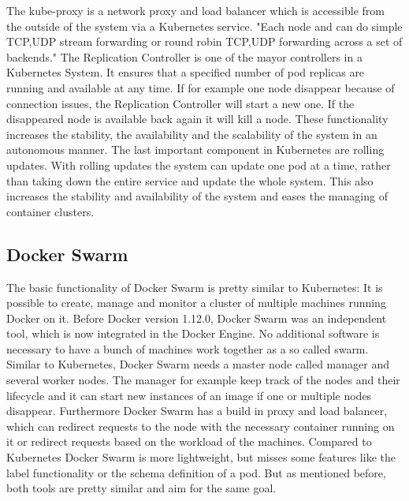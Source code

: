 The kube-proxy is a network proxy and load balancer which is accessible from the outside of the system via a Kubernetes service.\cite[cf.][p. 7]{Mulyana:2016}
"Each node and can do simple TCP,UDP stream forwarding or round robin TCP,UDP forwarding across a set of backends."\cite{Kubernetes:kube-proxy:2016}
The Replication Controller is one of the mayor controllers in a Kubernetes System.
It ensures that a specified number of pod replicas are running and available at any time.\cite[cf.]{Kubernetes:replication-controller:2016}
If for example one node disappear because of connection issues, the Replication Controller will start a new one.
If the disappeared node is available back again it will kill a node.
These functionality increases the stability, the availability and the scalability of the system in an autonomous manner.
The last important component in Kubernetes are rolling updates.
With rolling updates the system can update one pod at a time, rather than taking down the entire service and update the whole system.\cite[cf.]{Kubernetes:rolling-updates:2016}
This also increases the stability and availability of the system and eases the managing of container clusters.

\subsection{Docker Swarm}
The basic functionality of Docker Swarm is pretty similar to Kubernetes: It is possible to create, manage and monitor a cluster of multiple machines running Docker on it.
Before Docker version 1.12.0, Docker Swarm was an independent tool, which is now integrated in the Docker Engine.\cite[cf.]{dockerSwarm}
No additional software is necessary to have a bunch of machines work together as a so called swarm.
Similar to Kubernetes, Docker Swarm needs a master node called manager and several worker nodes.
The manager for example keep track of the nodes and their lifecycle and it can start new instances of an image if one or multiple nodes disappear.
Furthermore Docker Swarm has a build in proxy and load balancer, which can redirect requests to the node with the necessary container running on it or redirect requests based on the workload of the machines.
Compared to Kubernetes Docker Swarm is more lightweight, but misses some features like the label functionality or the schema definition of a pod.
But as mentioned before, both tools are pretty similar and aim for the same goal.


